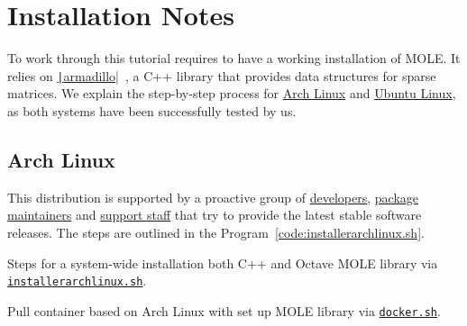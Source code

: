 \chapter{Installation Notes}

To work through this tutorial requires to have a working installation
of MOLE.
It relies on
\href{https://gitlab.com/conradsnicta/armadillo-code}{\texttt|armadillo|}~\cite{Sanderson2019},
a C++ library that provides data structures for sparse matrices.
We explain the step-by-step process for
\href{https://wiki.archlinux.org/title/Pacman/Rosetta}{Arch Linux}
and \href{https://help.ubuntu.com/lts/ubuntu-help/index.html}{Ubuntu Linux},
as both systems have been successfully tested by us.

\section{Arch Linux}

This distribution is supported by a proactive group of
\href{https://archlinux.org/people/developers}{developers},
\href{https://archlinux.org/people/package-maintainers}{package maintainers}
and \href{https://archlinux.org/people/support-staff}{support staff}
that try to provide the latest stable software releases.
The steps are outlined in the Program~\ref{code:installerarchlinux.sh}.

\begin{listing}[ht!]
	\tiny
	\centering
	\caption{Steps for a system-wide installation both C++ and Octave
		MOLE library via
		\href{https://raw.githubusercontent.com/carlosal1015/mole_examples/main/tutorial/installerarchlinux.sh}{\texttt{installerarchlinux.sh}}.}
	\label{code:installerarchlinux.sh}
\end{listing}

\begin{listing}[ht!]
	\tiny
	\centering
	\caption{Pull container based on Arch Linux with set up MOLE
		library via \href{https://raw.githubusercontent.com/carlosal1015/mole_examples/main/tutorial/docker.sh}{\texttt{docker.sh}}.}
	\label{code:docker.sh}
\end{listing}

